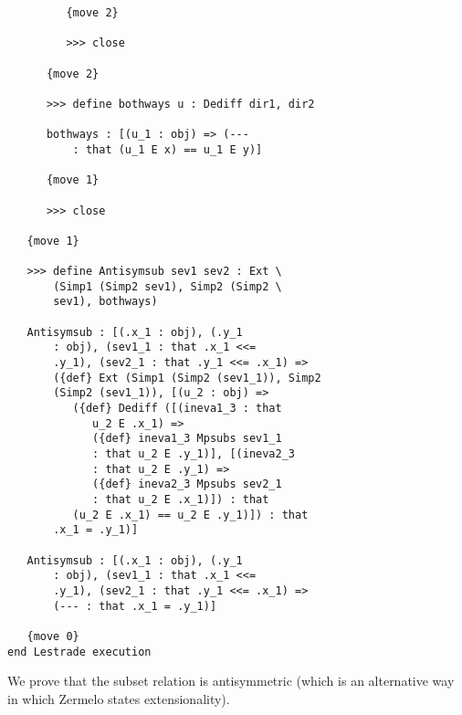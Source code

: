 \documentclass[12pt]{article}
\begin{document}
\begin{verbatim}
         {move 2}

         >>> close

      {move 2}

      >>> define bothways u : Dediff dir1, dir2

      bothways : [(u_1 : obj) => (--- 
          : that (u_1 E x) == u_1 E y)]

      {move 1}

      >>> close

   {move 1}

   >>> define Antisymsub sev1 sev2 : Ext \
       (Simp1 (Simp2 sev1), Simp2 (Simp2 \
       sev1), bothways)

   Antisymsub : [(.x_1 : obj), (.y_1 
       : obj), (sev1_1 : that .x_1 <<= 
       .y_1), (sev2_1 : that .y_1 <<= .x_1) => 
       ({def} Ext (Simp1 (Simp2 (sev1_1)), Simp2 
       (Simp2 (sev1_1)), [(u_2 : obj) => 
          ({def} Dediff ([(ineva1_3 : that 
             u_2 E .x_1) => 
             ({def} ineva1_3 Mpsubs sev1_1 
             : that u_2 E .y_1)], [(ineva2_3 
             : that u_2 E .y_1) => 
             ({def} ineva2_3 Mpsubs sev2_1 
             : that u_2 E .x_1)]) : that 
          (u_2 E .x_1) == u_2 E .y_1)]) : that 
       .x_1 = .y_1)]

   Antisymsub : [(.x_1 : obj), (.y_1 
       : obj), (sev1_1 : that .x_1 <<= 
       .y_1), (sev2_1 : that .y_1 <<= .x_1) => 
       (--- : that .x_1 = .y_1)]

   {move 0}
end Lestrade execution
\end{verbatim}

We prove that the subset relation is antisymmetric (which is an alternative way in which Zermelo states extensionality).
\end{document}
